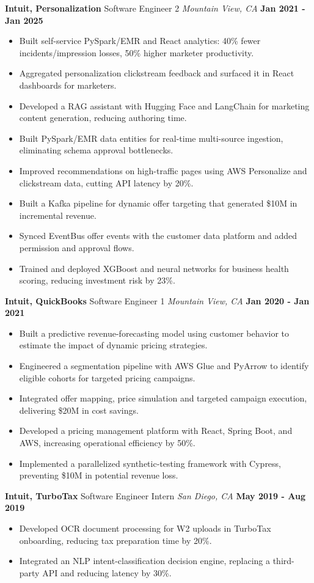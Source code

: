 \documentclass[10pt, letterpaper]{article}
\newcommand{\jobentry}[4]{
  \noindent\textbf{#1} \hfill #2 \hfill \textit{#3} \hfill \textbf{#4}
}
\begin{document}
\jobentry{Intuit, Personalization}{Software Engineer 2}{Mountain View, CA}{Jan 2021 - Jan 2025}
\begin{itemize}
\item Built self-service PySpark/EMR and React analytics: 40\% fewer incidents/impression losses, 50\% higher marketer productivity.
\item Aggregated personalization clickstream feedback and surfaced it in React dashboards for marketers.
\item Developed a RAG assistant with Hugging Face and LangChain for marketing content generation, reducing authoring time.
\item Built PySpark/EMR data entities for real-time multi-source ingestion, eliminating schema approval bottlenecks.
\item Improved recommendations on high-traffic pages using AWS Personalize and clickstream data, cutting API latency by 20\%.
\item Built a Kafka pipeline for dynamic offer targeting that generated \$10M in incremental revenue.
\item Synced EventBus offer events with the customer data platform and added permission and approval flows.
\item Trained and deployed XGBoost and neural networks for business health scoring, reducing investment risk by 23\%.
\end{itemize}
\jobentry{Intuit, QuickBooks}{Software Engineer 1}{Mountain View, CA}{Jan 2020 - Jan 2021}
\begin{itemize}
\item Built a predictive revenue-forecasting model using customer behavior to estimate the impact of dynamic pricing strategies.
\item Engineered a segmentation pipeline with AWS Glue and PyArrow to identify eligible cohorts for targeted pricing campaigns.
\item Integrated offer mapping, price simulation and targeted campaign execution, delivering \$20M in cost savings.
\item Developed a pricing management platform with React, Spring Boot, and AWS, increasing operational efficiency by 50\%.
\item Implemented a parallelized synthetic-testing framework with Cypress, preventing \$10M in potential revenue loss.
\end{itemize}
\jobentry{Intuit, TurboTax}{Software Engineer Intern}{San Diego, CA}{May 2019 - Aug 2019}
\begin{itemize}
\item Developed OCR document processing for W2 uploads in TurboTax onboarding, reducing tax preparation time by 20\%.
\item Integrated an NLP intent-classification decision engine, replacing a third-party API and reducing latency by 30\%.
\end{itemize}
\end{document}
